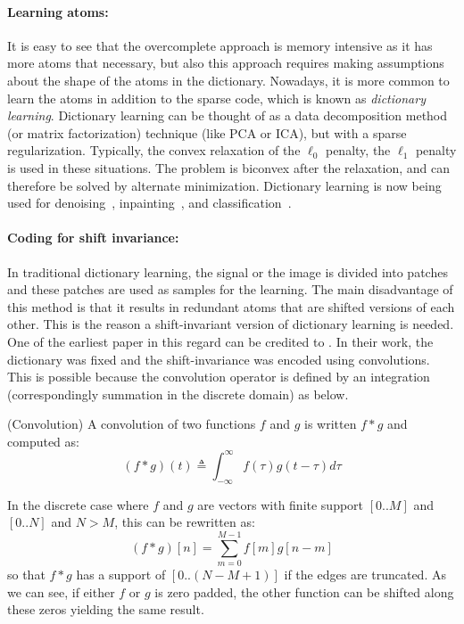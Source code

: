 \paragraph{Learning atoms:} It is easy to see that the overcomplete approach is memory intensive as it has more atoms that necessary, but also this approach requires making assumptions about the shape of the atoms in the dictionary. Nowadays, it is more common to learn the atoms in addition to the sparse code, which is known as \emph{dictionary learning}. Dictionary learning can be thought of as a data decomposition method (or matrix factorization) technique (like \ac{PCA} or \ac{ICA}), but with a sparse regularization. Typically, the convex relaxation of the $\ell_0$ penalty, the $\ell_1$ penalty is used in these situations. The problem is biconvex after the relaxation, and can therefore be solved by alternate minimization. Dictionary learning is now being used for denoising~\citep{elad2006image}, inpainting~\citep{mairal2009online}, and classification~\citep{mairal2009supervised}. 

\paragraph{Coding for shift invariance:}
In traditional dictionary learning, the signal or the image is divided into patches and these patches are used as samples for the learning. The main disadvantage of this method is that it results in redundant atoms that are shifted versions of each other. This is the reason a shift-invariant version of dictionary learning is needed. One of the earliest paper in this regard can be credited to \cite{lewicki1999coding}. In their work, the dictionary was fixed and the shift-invariance was encoded using convolutions. 
This is possible because the convolution operator is defined by an integration (correspondingly summation in the discrete domain) as below.
\vspace{\parskip}
%
\begin{definition}{(Convolution)}
\label{def:convolution}
A convolution of two functions $f$ and $g$ is written $f * g$ and computed as:
\begin{equation}
(f * g)(t) \triangleq \int_{-\infty}^{\infty} f(\tau)g(t-\tau) d\tau
\end{equation}
\end{definition}

In the discrete case where $f$ and $g$ are vectors with finite support $[0..M]$ and $[0..N]$ and $N > M$, this can be rewritten as:
%
\begin{equation}
(f * g)[n] = \sum_{m=0}^{M-1} f[m]g[n-m]
\end{equation}
%
so that $f * g$ has a support of $[0..(N - M + 1)]$ if the edges are truncated. As we can see, if either $f$ or $g$ is zero padded, the other function can be shifted along these zeros yielding the same result.

